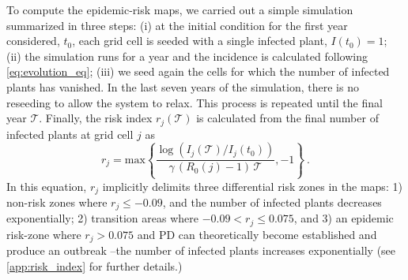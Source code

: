     To compute the epidemic-risk maps, we carried out a simple simulation
    summarized in three steps: (i) at the initial condition for the first year
    considered, $t_0$, each grid cell is seeded with a single infected plant,
$I(t_0)=1$; (ii) the simulation runs for a year and the incidence is calculated
    following \cref{eq:evolution_eq}; (iii) we seed again the cells for which
    the
    number of infected plants has vanished. In the last seven years of the
    simulation, there is no reseeding to allow the system to relax. This
    process is
    repeated until the final year $\mathcal{T}$. Finally, the risk index
$r_j(\mathcal{T})$ is calculated from the final number of infected plants at
    grid cell $j$ as
    \begin{equation}
        r_j=\textrm{max}\left\{\frac{
            \log(I_j(\mathcal{T})/I_j(t_0))}{\gamma\,
            (R_0(j)-1)\, \mathcal{T}}, -1 \right\} \ .
        \label{eq:riskmeasure}
    \end{equation}
    In this equation, $r_j$ implicitly delimits three differential risk zones
    in the maps: 1) non-risk zones where $r_j \le -0.09$, and the number of
    infected plants decreases exponentially; 2) transition areas where $-0.09 <
r_j
\le 0.075 $, and 3) an epidemic risk-zone where $ r_j >0.075$ and PD can
    theoretically become established and produce an outbreak --the number of
    infected plants increases exponentially (see \cref{app:risk_index} for
    further details.)

